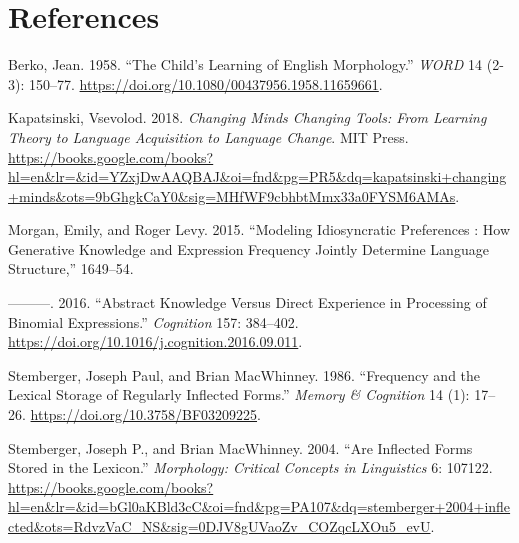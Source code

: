 \documentclass[
  letterpaper,
  DIV=11,
  numbers=noendperiod,
  nottoc,
  oneside]{scrreprt}
\newlength{\cslhangindent}
\newenvironment{CSLReferences}[2] %
 {\begin{list}{}{%
  \setlength{\itemindent}{0pt}
  \setlength{\leftmargin}{0pt}
  \setlength{\parsep}{0pt}
  \ifodd #1
   \setlength{\leftmargin}{\cslhangindent}
   \setlength{\itemindent}{-1\cslhangindent}
  \fi
  \setlength{\itemsep}{#2\baselineskip}}}
 {\end{list}}
\begin{document}

\chapter*{References}\label{references}


\label{refs}
\begin{CSLReferences}{1}{0}
Berko, Jean. 1958. {``The Child's Learning of English Morphology.''}
\emph{{\emph{WORD}}} 14 (2-3): 150--77.
\url{https://doi.org/10.1080/00437956.1958.11659661}.

Kapatsinski, Vsevolod. 2018. \emph{Changing Minds Changing Tools: From
Learning Theory to Language Acquisition to Language Change}. MIT Press.
\url{https://books.google.com/books?hl=en&lr=&id=YZxjDwAAQBAJ&oi=fnd&pg=PR5&dq=kapatsinski+changing+minds&ots=9bGhgkCaY0&sig=MHfWF9cbhbtMmx33a0FYSM6AMAs}.

Morgan, Emily, and Roger Levy. 2015. {``Modeling Idiosyncratic
Preferences : How Generative Knowledge and Expression Frequency Jointly
Determine Language Structure,''} 1649--54.

---------. 2016. {``Abstract Knowledge Versus Direct Experience in
Processing of Binomial Expressions.''} \emph{Cognition} 157: 384--402.
\url{https://doi.org/10.1016/j.cognition.2016.09.011}.

Stemberger, Joseph Paul, and Brian MacWhinney. 1986. {``Frequency and
the Lexical Storage of Regularly Inflected Forms.''} \emph{Memory \&
Cognition} 14 (1): 17--26. \url{https://doi.org/10.3758/BF03209225}.

Stemberger, Joseph P., and Brian MacWhinney. 2004. {``Are Inflected
Forms Stored in the Lexicon.''} \emph{Morphology: Critical Concepts in
Linguistics} 6: 107122.
\url{https://books.google.com/books?hl=en&lr=&id=bGl0aKBld3cC&oi=fnd&pg=PA107&dq=stemberger+2004+inflected&ots=RdvzVaC_NS&sig=0DJV8gUVaoZv_COZqcLXOu5_evU}.

\end{CSLReferences}
\end{document}
